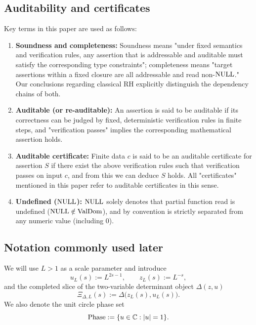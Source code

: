 \subsection{Auditability and certificates}
Key terms in this paper are used as follows:
\begin{enumerate}
  \item \textbf{Soundness and completeness:} Soundness means "under fixed semantics and verification rules, any assertion that is addressable and auditable must satisfy the corresponding type constraints"; completeness means "target assertions within a fixed closure are all addressable and read non-$\mathrm{NULL}$." Our conclusions regarding classical RH explicitly distinguish the dependency chains of both.\par
  \item \textbf{Auditable (or re-auditable):} An assertion is said to be auditable if its correctness can be judged by fixed, deterministic verification rules in finite steps, and "verification passes" implies the corresponding mathematical assertion holds.\par
  \item \textbf{Auditable certificate:} Finite data $c$ is said to be an auditable certificate for assertion $S$ if there exist the above verification rules such that verification passes on input $c$, and from this we can deduce $S$ holds. All "certificates" mentioned in this paper refer to auditable certificates in this sense.\par
  \item \textbf{Undefined ($\mathrm{NULL}$):} $\mathrm{NULL}$ solely denotes that partial function read is undefined ($\mathrm{NULL}\notin\mathrm{ValDom}$), and by convention is strictly separated from any numeric value (including $0$).\par
\end{enumerate}

\subsection{Notation commonly used later}
We will use $L>1$ as a scale parameter and introduce
$$
u_L(s):=L^{2s-1},\qquad z_L(s):=L^{-s},
$$
and the completed slice of the two-variable determinant object $\Delta(z,u)$
$$
\Xi_{\Delta,L}(s):=\Delta\bigl(z_L(s),u_L(s)\bigr).
$$
We also denote the unit circle phase set
$$
\mathrm{Phase}:=\{u\in\mathbb{C}:\left\lvert u\right\rvert=1\}.
$$
